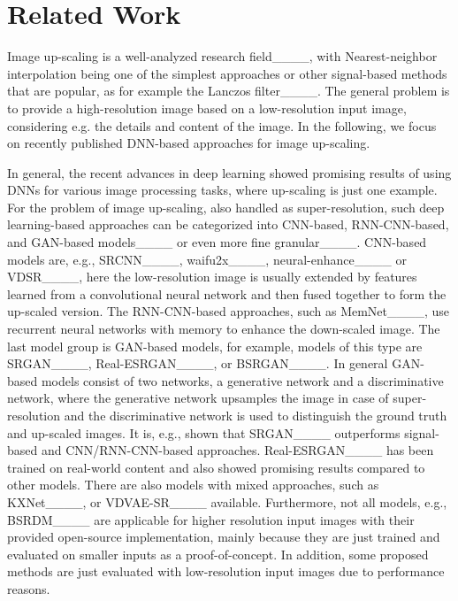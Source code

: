 \section{Related Work}
\label{sec:soa}
Image up-scaling is a well-analyzed research field____, with Nearest-neighbor interpolation being one of the simplest approaches or other signal-based methods that are popular, as for example the Lanczos filter____.
The general problem is to provide a high-resolution image based on a low-resolution input image, considering e.g. the details and content of the image.
In the following, we focus on recently published DNN-based approaches for image up-scaling.

In general, the recent advances in deep learning showed promising results of using DNNs for various image processing tasks, where up-scaling is just one example.
For the problem of image up-scaling, also handled as super-resolution, such deep learning-based approaches can be categorized into CNN-based, RNN-CNN-based, and GAN-based models____ or even more fine granular____.
CNN-based models are, e.g., SRCNN____, waifu2x____, neural-enhance____ or VDSR____, here the low-resolution image is usually extended by features learned from a convolutional neural network and then fused together to form the up-scaled version.
The RNN-CNN-based approaches, such as MemNet____, use recurrent neural networks with memory to enhance the down-scaled image.
The last model group is GAN-based models, for example, models of this type are SRGAN____, Real-ESRGAN____, or BSRGAN____.
In general GAN-based models consist of two networks, a generative network and a discriminative network, where the generative network upsamples the image in case of super-resolution and the discriminative network is used to distinguish the ground truth and up-scaled images.
It is, e.g., shown that SRGAN____ outperforms signal-based and CNN/RNN-CNN-based approaches.
Real-ESRGAN____ has been trained on real-world content and also showed promising results compared to other models.
There are also models with mixed approaches, such as KXNet____, or VDVAE-SR____ available.
Furthermore, not all models, e.g., BSRDM____ are applicable for higher resolution input images with their provided open-source implementation, mainly because they are just trained and evaluated on smaller inputs as a proof-of-concept.
In addition, some proposed methods are just evaluated with low-resolution input images due to performance reasons.

